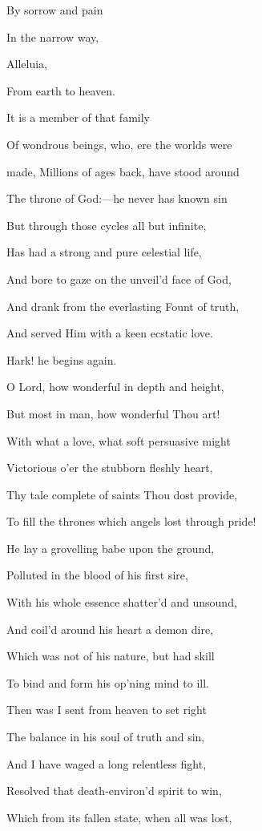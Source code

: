 By sorrow and pain

In the narrow way,

Alleluia,

From earth to heaven.


It is a member of that family

Of wondrous beings, who, ere the worlds were

made, Millions of ages back, have stood around

The throne of God:—he never has known sin

But through those cycles all but infinite,

Has had a strong and pure celestial life,

And bore to gaze on the unveil'd face of God,

And drank from the everlasting Fount of truth,

And served Him with a keen ecstatic love.

Hark! he begins again.


O Lord, how wonderful in depth and height,

But most in man, how wonderful
Thou art!

With what a love, what soft persuasive might

Victorious o'er the stubborn
fleshly heart,

Thy tale complete of saints Thou dost provide,

To fill the thrones which angels lost through
pride!

He lay a grovelling babe upon the ground,

Polluted in the blood of his
first sire,

With his whole essence shatter'd and unsound,

And coil'd around his heart a
demon dire,

Which was not of his nature, but had skill

To bind and form his op'ning mind to ill. 

Then was I sent from heaven to set right

The balance in his soul of
truth and sin,

And I have waged a long relentless fight,

Resolved that death-environ'd
spirit to win,

Which from its fallen state, when all was lost,


